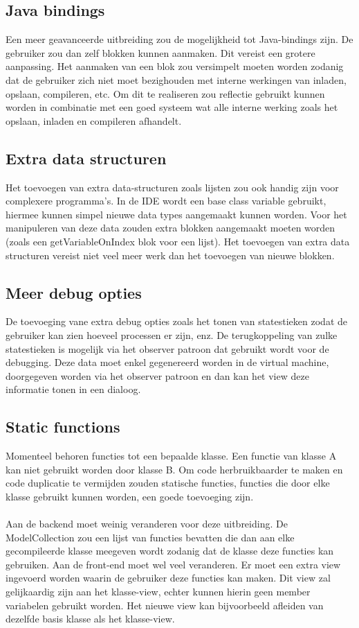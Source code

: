 \documentclass[]{article}
\begin{document}
\subsection{Java bindings}
Een meer geavanceerde uitbreiding zou de mogelijkheid tot Java-bindings zijn. De gebruiker zou dan zelf blokken kunnen aanmaken. Dit vereist een grotere aanpassing. Het aanmaken van een blok zou versimpelt moeten worden zodanig dat de gebruiker zich niet moet bezighouden met interne werkingen van inladen, opslaan, compileren, etc. Om dit te realiseren zou reflectie gebruikt kunnen worden in combinatie met een goed systeem wat alle interne werking zoals het opslaan, inladen en compileren afhandelt.

\subsection{Extra data structuren}
Het toevoegen van extra data-structuren zoals lijsten zou ook handig zijn voor complexere programma's. In de IDE wordt een base class variable gebruikt, hiermee kunnen simpel nieuwe data types aangemaakt kunnen worden. Voor het manipuleren van deze data zouden extra blokken aangemaakt moeten worden (zoals een getVariableOnIndex blok voor een lijst). Het toevoegen van extra data structuren vereist niet veel meer werk dan het toevoegen van nieuwe blokken.

\subsection{Meer debug opties}
De toevoeging vane extra debug opties zoals het tonen van statestieken zodat de gebruiker kan zien hoeveel processen er zijn, enz. De terugkoppeling van zulke statestieken is mogelijk via het observer patroon dat gebruikt wordt voor de debugging. Deze data moet enkel gegenereerd worden in de virtual machine, doorgegeven worden via het observer patroon en dan kan het view deze informatie tonen in een dialoog.

\subsection{Static functions}
Momenteel behoren functies tot een bepaalde klasse. Een functie van klasse A kan niet gebruikt worden door klasse B. Om code herbruikbaarder te maken en code duplicatie te vermijden zouden statische functies, functies die door elke klasse gebruikt kunnen worden, een goede toevoeging zijn. \\\\
Aan de backend moet weinig veranderen voor deze uitbreiding. De ModelCollection zou een lijst van functies bevatten die dan aan elke gecompileerde klasse meegeven wordt zodanig dat de klasse deze functies kan gebruiken. Aan de front-end moet wel veel veranderen. Er moet een extra view ingevoerd worden waarin de gebruiker deze functies kan maken. Dit view zal gelijkaardig zijn aan het klasse-view, echter kunnen hierin geen member variabelen gebruikt worden. Het nieuwe view kan bijvoorbeeld afleiden van dezelfde basis klasse als het klasse-view. 
\end{document}
